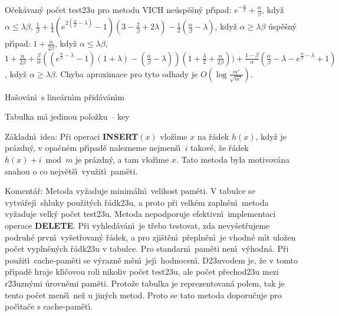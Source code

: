 \documentclass[a4paper,12pt]{article}
\begin{document}
\flushpar O\v cek\'avan\'y po\v cet test\accent23u pro metodu VICH\newline 
ne\'usp\v e\v sn\'y p\v r\'\i pad:\newline 
\phantom{---}$e^{-\frac {\alpha}{\beta}}+\frac {\alpha}{\beta}$, kdy\v z  $
\alpha\le\lambda\beta$, \newline 
\phantom{---}$\frac 1{\beta}+\frac 14(e^{2(\frac {\alpha}{\beta}-
\lambda )}-1)(3-\frac 2{\beta}+2\lambda )-\frac 12(\frac {\alpha}{
\beta}-\lambda )$, kdy\v z $\alpha\ge\lambda\beta$\newline 
\'usp\v e\v sn\'y p\v r\'\i pad:\newline 
\phantom{---}$1+\frac {\alpha}{2\beta}$, kdy\v z $\alpha\le\lambda
\beta$, \newline 
\phantom{---}$1+\frac {\alpha}{2\beta}+\frac {\beta}{\alpha}((e^{\frac {
\alpha}{\beta}-\lambda}-1)(1+\lambda )-(\frac {\alpha}{\beta}-\lambda 
))(1+\frac {\lambda}2+\frac {\alpha}{2\beta}))+\frac {1-\beta}{\alpha}
(\frac {\alpha}{\beta}-\lambda -e^{\frac {\alpha}{\beta}-\lambda}
+1)$, 
kdy\v z $\alpha\ge\lambda\beta$.
\medskip
\flushpar Chyba aproximace pro tyto odhady je $O(\log\frac {m'}{\sqrt {
m'}})$.


\heading
Ha\v sov\'an\'\i\ s line\'arn\'\i m p\v rid\'av\'an\'\i m
\endheading

\flushpar Tabulka m\'a jedinou polo\v zku -- key
\medskip

\flushpar Z\'akladn\'\i\ idea:  P\v ri operaci {\bf INSERT$(x)$} vlo\v z\'\i me $
x$ 
na \v r\'adek $h(x)$, kdy\v z je pr\'azdn\'y, v opa\v cn\'em p\v r\'\i pad\v e 
nalezneme nejmen\v s\'\i\ $i$ takov\'e, \v ze \v r\'adek $h(x)+i\bmod 
m$ je 
pr\'azdn\'y, a tam vlo\v z\'\i me $x$. Tato metoda byla motivov\'ana snahou o co nejv\v et\v s\'\i\ vyu\v zit\'\i\ pam\v eti. 
\medskip

\flushpar Koment\'a\v r:  Metoda vy\v zaduje minim\'aln\'\i\ velikost pam\v eti.  
V tabulce se vytv\'a\v rej\'\i\ shluky pou\v zit\'ych \v r\'adk\accent23u, a proto 
p\v ri velk\'em zapln\v en\'\i\ metoda vy\v zaduje velk\'y po\v cet test\accent23u.  
Metoda nepodporuje efektivn\'\i\ implementaci operace {\bf DELETE}.  
P\v ri vy\-hle\-d\'a\-v\'a\-n\'\i\ je t\v reba testovat, zda nevy\v set\v rujeme 
podruh\'e prvn\'\i\ vy\v set\v rovan\'y \v r\'adek, a pro zji\v st\v en\'\i\ p\v repln\v en\'\i\ je 
vhodn\'e m\'\i t ulo\v zen po\v cet vypln\v en\'ych \v r\'adk\accent23u v tabulce. Pro standarn\'\i\ pam\v eti nen\'\i\ v\'yhodn\'a. P\v ri pou\v zit\'\i\ cache-pam\v eti se v\'yrazn\v e m\v en\'\i\ jej\'\i\ hodnocen\'\i. D\accent23uvodem je, \v ze v tomto p\v r\'\i pad\v e hraje kl\'\i\v covou roli nikoliv po\v cet test\accent23u, ale po\v cet p\v rechod\accent23u mezi r\accent23uzn\'ymi \'urovn\v emi pam\v eti. Proto\v ze tabulka je reprezentovan\'a polem, tak je tento po\v cet men\v s\'\i\ ne\v z u jin\'ych metod. Proto se tato metoda doporu\v cuje pro po\v c\'\i ta\v ce s cache-pam\v et\'\i .
\bigskip
\end{document}
